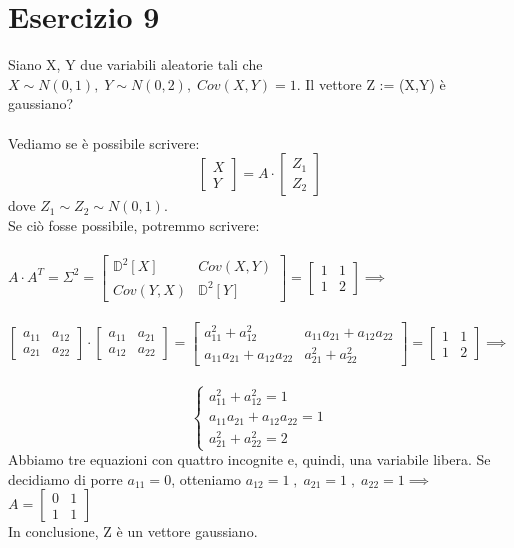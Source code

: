 \documentclass{article}
\begin{document}
\section*{Esercizio 9}
Siano X, Y due variabili aleatorie tali che $X \sim N(0,1), \; Y \sim N(0,2), \; Cov(X,Y) = 1$. Il vettore Z := (X,Y) è gaussiano?\\
\\
Vediamo se è possibile scrivere:
\[ \left[\begin{matrix} X \\ Y \end{matrix}\right] = A \cdot \left[\begin{matrix} Z_{1} \\ Z_{2} \end{matrix}\right] \]
dove $Z_{1} \sim Z_{2} \sim N(0,1)$.\\
Se ciò fosse possibile, potremmo scrivere:\\ \\
$A \cdot A^{T} = \Sigma^{2} = \left[\begin{matrix} \mathbb{D}^{2}[X] & Cov(X,Y) \\ Cov(Y,X) & \mathbb{D}^{2}[Y]\end{matrix}\right] = \left[\begin{matrix} 1 & 1 \\ 1 & 2 \end{matrix}\right] \implies$\\ \\
$\left[\begin{matrix} a_{11} & a_{12} \\ a_{21} & a_{22} \end{matrix}\right] \cdot \left[\begin{matrix} a_{11} & a_{21} \\ a_{12} & a_{22} \end{matrix}\right] = \left[\begin{matrix} a_{11}^{2}+a_{12}^{2} & a_{11}a_{21}+a_{12}a_{22} \\ a_{11}a_{21}+a_{12}a_{22} & a_{21}^{2}+a_{22}^{2} \end{matrix}\right] = \left[\begin{matrix} 1 & 1 \\ 1 & 2 \end{matrix}\right] \implies$\\ \\
\[
\begin{cases}
a_{11}^{2}+a_{12}^{2}=1\\
a_{11}a_{21}+a_{12}a_{22}=1\\
a_{21}^{2}+a_{22}^{2}=2
\end{cases}
\]
Abbiamo tre equazioni con quattro incognite e, quindi, una variabile libera. Se decidiamo di porre $a_{11}=0$, otteniamo $a_{12}=1 \; , \; a_{21}=1 \; , \; a_{22}=1 \implies$\\
$A = \left[\begin{matrix} 0 & 1 \\ 1 & 1 \end{matrix}\right]$\\
In conclusione, Z è un vettore gaussiano.
\end{document}
